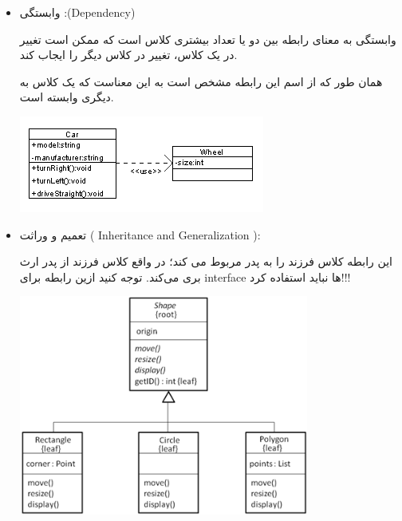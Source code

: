 \documentclass[]{article}
\begin{document}
\begin{itemize}[label=\textcolor{listColor}{$\blacklozenge$}]
\begin{center}
\end{center}
\newpage
\begin{itemize}[label=\textcolor{umlrelcolor}{$\blacksquare$}]
 \item
   {\fehrest \textcolor{umlrelcolor}{وابستگی :(Dependency)
 }}
 

 
 وابستگی به معنای رابطه بین دو یا تعداد بیشتری کلاس است که ممکن است تغییر در یک کلاس، تغییر در کلاس دیگر را ایجاب کند.
 
همان طور که از اسم این رابطه مشخص است به این معناست که یک کلاس به دیگری وابسته است.


   \begin{center}

\includegraphics[]{images/image3.png}

\end{center}


 \item
   {\fehrest \textcolor{umlrelcolor}{تعمیم و وراثت ( Inheritance and Generalization ):
 }}
 

 
 این رابطه کلاس فرزند را به پدر مربوط می کند؛ در واقع کلاس فرزند از پدر ارث بری می‌کند.
توجه کنید ازین رابطه برای interface  ها نباید استفاده کرد!!!


   \begin{center}

\includegraphics[width=0.75\textwidth]{images/image10.png}


\end{center}
\end{itemize}
\end{itemize}
\end{document}
